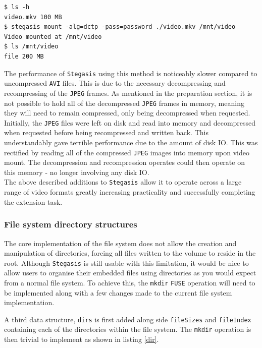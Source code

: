 \documentclass[paper=a4, fontsize=11pt,twoside]{scrartcl}    %
\numberwithin{table}{section}
\numberwithin{figure}{section}
\numberwithin{algorithm}{section}
\begin{document}
\begin{lstlisting}[caption={Demonstration of 200\% embedding capacity.}, frame=single, label=200cap]
$ ls -h
video.mkv 100 MB
$ stegasis mount -alg=dctp -pass=password ./video.mkv /mnt/video
Video mounted at /mnt/video
$ ls /mnt/video
file 200 MB
\end{lstlisting}

The performance of \texttt{Stegasis} using this method is noticeably slower compared to uncompressed \texttt{AVI} files. This is due to the necessary decompressing and recompressing of the \texttt{JPEG} frames. As mentioned in the preparation section, it is not possible to hold all of the decompressed \texttt{JPEG} frames in memory, meaning they will need to remain compressed, only being decompressed when requested. Initially, the \texttt{JPEG} files were left on disk and read into memory and decompressed when requested before being recompressed and written back. This understandably gave terrible performance due to the amount of disk IO. This was rectified by reading all of the compressed \texttt{JPEG} images into memory upon video mount. The decompression and recompression operates could then operate on this memory - no longer involving any disk IO.\\

\noindent
The above described additions to \texttt{Stegasis} allow it to operate across a large range of video formats greatly increasing practicality and successfully completing the extension task.

\subsubsection{File system directory structures}

The core implementation of the file system does not allow the creation and manipulation of directories, forcing all files written to the volume to reside in the root. Although \texttt{Stegasis} is still usable with this limitation, it would be nice to allow users to organise their embedded files using directories as you would expect from a normal file system. To achieve this, the \texttt{mkdir} \texttt{FUSE} operation will need to be implemented along with a few changes made to the current file system implementation.

A third data structure, \texttt{dirs} is first added along side \texttt{fileSizes} and \texttt{fileIndex} containing each of the directories within the file system. The \texttt{mkdir} operation is then trivial to implement as shown in listing \ref{dir}.
\end{document}
